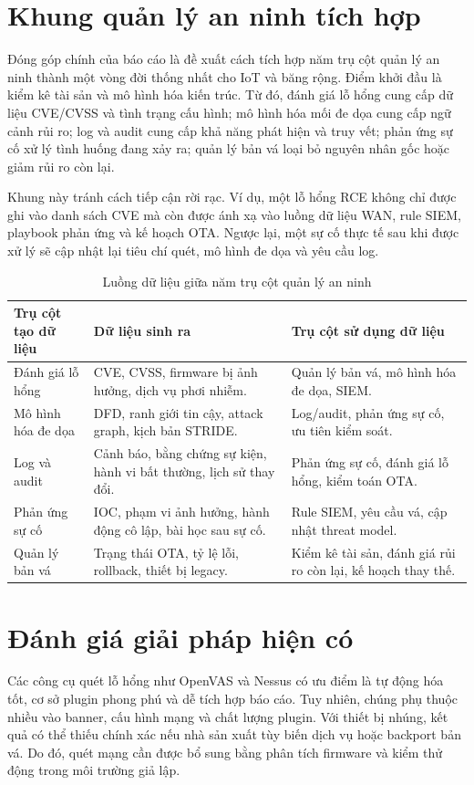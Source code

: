 \documentclass[../DoAn.tex]{subfiles}
\begin{document}
\section{Khung quản lý an ninh tích hợp}
Đóng góp chính của báo cáo là đề xuất cách tích hợp năm trụ cột quản lý an ninh thành một vòng đời thống nhất cho IoT và băng rộng. Điểm khởi đầu là kiểm kê tài sản và mô hình hóa kiến trúc. Từ đó, đánh giá lỗ hổng cung cấp dữ liệu CVE/CVSS và tình trạng cấu hình; mô hình hóa mối đe dọa cung cấp ngữ cảnh rủi ro; log và audit cung cấp khả năng phát hiện và truy vết; phản ứng sự cố xử lý tình huống đang xảy ra; quản lý bản vá loại bỏ nguyên nhân gốc hoặc giảm rủi ro còn lại.

Khung này tránh cách tiếp cận rời rạc. Ví dụ, một lỗ hổng RCE không chỉ được ghi vào danh sách CVE mà còn được ánh xạ vào luồng dữ liệu WAN, rule SIEM, playbook phản ứng và kế hoạch OTA. Ngược lại, một sự cố thực tế sau khi được xử lý sẽ cập nhật lại tiêu chí quét, mô hình đe dọa và yêu cầu log.

\begin{table}[H]
\centering
\begin{tabular}{|p{3cm}|p{4.6cm}|p{5.2cm}|}
\hline
\textbf{Trụ cột tạo dữ liệu} & \textbf{Dữ liệu sinh ra} & \textbf{Trụ cột sử dụng dữ liệu} \\ \hline
Đánh giá lỗ hổng & CVE, CVSS, firmware bị ảnh hưởng, dịch vụ phơi nhiễm. & Quản lý bản vá, mô hình hóa đe dọa, SIEM. \\ \hline
Mô hình hóa đe dọa & DFD, ranh giới tin cậy, attack graph, kịch bản STRIDE. & Log/audit, phản ứng sự cố, ưu tiên kiểm soát. \\ \hline
Log và audit & Cảnh báo, bằng chứng sự kiện, hành vi bất thường, lịch sử thay đổi. & Phản ứng sự cố, đánh giá lỗ hổng, kiểm toán OTA. \\ \hline
Phản ứng sự cố & IOC, phạm vi ảnh hưởng, hành động cô lập, bài học sau sự cố. & Rule SIEM, yêu cầu vá, cập nhật threat model. \\ \hline
Quản lý bản vá & Trạng thái OTA, tỷ lệ lỗi, rollback, thiết bị legacy. & Kiểm kê tài sản, đánh giá rủi ro còn lại, kế hoạch thay thế. \\ \hline
\end{tabular}
\caption{Luồng dữ liệu giữa năm trụ cột quản lý an ninh}
\label{tab:integrated-pillars-flow}
\end{table}

\section{Đánh giá giải pháp hiện có}
Các công cụ quét lỗ hổng như OpenVAS và Nessus có ưu điểm là tự động hóa tốt, cơ sở plugin phong phú và dễ tích hợp báo cáo. Tuy nhiên, chúng phụ thuộc nhiều vào banner, cấu hình mạng và chất lượng plugin. Với thiết bị nhúng, kết quả có thể thiếu chính xác nếu nhà sản xuất tùy biến dịch vụ hoặc backport bản vá. Do đó, quét mạng cần được bổ sung bằng phân tích firmware và kiểm thử động trong môi trường giả lập.
\end{document}

